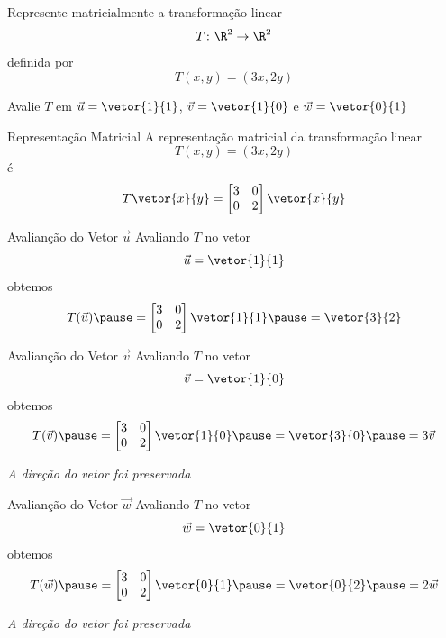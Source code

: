 \begin{question}
  Represente matricialmente a transformação linear
  \[
    T\colon \R^2 \to \R^2
  \]
  definida por
  \[
    T(x, y) = (3x, 2y)
  \]

  \medskip
  Avalie $T$ em
  \(
    \vec{u} = \vetor{1}{1}
  \),
  \(
    \vec{v} = \vetor{1}{0}
  \)
  e
  \(
    \vec{w} = \vetor{0}{1}
  \)
\end{question}

\begin{resolution}{Representação Matricial}
    A representação matricial da transformação linear
    \[
      T(x, y) = (3x, 2y)
    \]
    \pause
    é
    \[
      T \vetor{x}{y} =
      \begin{bmatrix}
        3 & 0 \\
        0 & 2
      \end{bmatrix}
      \vetor{x}{y}
    \]
\end{resolution}

\begin{resolution}{Avalianção do Vetor $\vec{u}$}
  Avaliando $T$ no vetor
  \[
    \vec{u} = \vetor{1}{1}
  \]
  \pause
  obtemos
  \[
    T(\vec{u})
    \pause
    = \begin{bmatrix}
        3 & 0\\
        0 & 2
    \end{bmatrix} \vetor{1}{1}
    \pause
    = \vetor{3}{2}
  \]
\end{resolution}

\begin{resolution}{Avalianção do Vetor $\vec{v}$}
  Avaliando $T$ no vetor
  \[
    \vec{v} = \vetor{1}{0}
  \]
  \pause
  obtemos
  \[
    T(\vec{v})
    \pause
    = \begin{bmatrix}
        3 & 0\\
        0 & 2
    \end{bmatrix} \vetor{1}{0}
    \pause
    = \vetor{3}{0}
    \pause
    = 3 \vec{v}
  \]

  \pause
  \emph{A direção do vetor foi preservada}
\end{resolution}

\begin{resolution}{Avalianção do Vetor $\vec{w}$}
  Avaliando $T$ no vetor
  \[
    \vec{w} = \vetor{0}{1}
  \]
  \pause
  obtemos
  \[
    T(\vec{w})
    \pause
    = \begin{bmatrix}
        3 & 0\\
        0 & 2
    \end{bmatrix} \vetor{0}{1}
    \pause
    = \vetor{0}{2}
    \pause
    = 2 \vec{w}
  \]

  \pause
  \emph{A direção do vetor foi preservada}
\end{resolution}

\endinput
